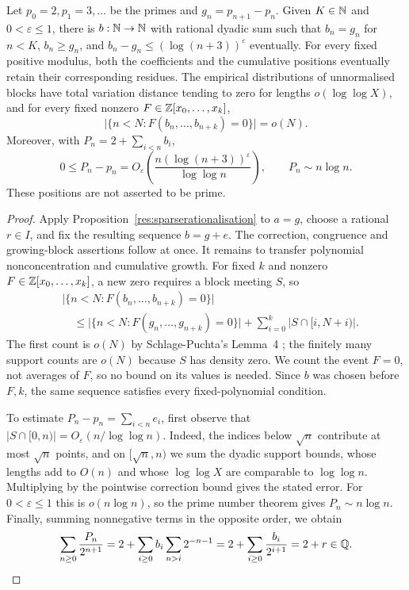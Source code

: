\documentclass[11pt]{article}
\begin{document}
\begin{corollary}\label{res:jointcountermodel}
Let $p_0=2,p_1=3,\ldots$ be the primes and $g_n=p_{n+1}-p_n$.
Given $K\in\mathbb{N}$ and $0<\varepsilon\le1$, there is $b:\mathbb{N}\to\mathbb{N}$ with
rational dyadic sum such that $b_n=g_n$ for $n<K$, $b_n\ge g_n$, and
$b_n-g_n\le(\log(n+3))^\varepsilon$ eventually.  For every fixed positive
modulus, both the coefficients and the cumulative positions eventually
retain their corresponding residues.  The empirical distributions of
unnormalised blocks have total variation distance tending to zero
for lengths $o(\log\log X)$, and for every fixed nonzero
$F\in\mathbb{Z}[x_0,\ldots,x_k]$,
\[
 \bigl|\{n<N:F(b_n,\ldots,b_{n+k})=0\}\bigr|=o(N).
\]
Moreover, with $P_n=2+\sum_{i<n}b_i$,
\[
 0\le P_n-p_n=O_\varepsilon\!\left(
       \frac{n(\log(n+3))^\varepsilon}{\log\log n}\right),
 \qquad P_n\sim n\log n.
\]
These positions are not asserted to be prime.
\end{corollary}

\begin{proof}
Apply Proposition~\ref{res:sparserationalisation} to $a=g$, choose a
rational $r\in I$, and fix the resulting sequence $b=g+e$.  The correction,
congruence and growing-block assertions follow at once.  It remains to
transfer polynomial nonconcentration and cumulative growth.
For fixed $k$ and nonzero $F\in\mathbb{Z}[x_0,\ldots,x_k]$, a new zero requires
a block meeting $S$, so
\[
 \begin{aligned}
 &\bigl|\{n<N:F(b_n,\ldots,b_{n+k})=0\}\bigr|\\
 &\quad\le\bigl|\{n<N:F(g_n,\ldots,g_{n+k})=0\}\bigr|
       +\sum_{i=0}^k|S\cap[i,N+i)|.
 \end{aligned}
\]
The first count is $o(N)$ by Schlage-Puchta's Lemma~4
\cite{schlagepuchta2011}; the finitely many support counts are $o(N)$
because $S$ has density zero.  We count the event $F=0$, not averages
of $F$, so no bound on its values is needed.  Since $b$ was chosen
before $F,k$, the same sequence satisfies every fixed-polynomial condition.

To estimate $P_n-p_n=\sum_{i<n}e_i$, first observe that
$|S\cap[0,n)|=O_\varepsilon(n/\log\log n)$.  Indeed, the indices below
$\sqrt n$ contribute at most $\sqrt n$ points, and on $[\sqrt n,n)$ we
sum the dyadic support bounds, whose lengths add to $O(n)$ and whose
$\log\log X$ are comparable to $\log\log n$.  Multiplying by the
pointwise correction bound gives the stated error.  For
$0<\varepsilon\le1$ this is $o(n\log n)$, so the prime number theorem
\cite[Chapter~6]{mv2007} gives $P_n\sim n\log n$.  Finally, summing
nonnegative terms in the opposite order, we obtain
\[
 \sum_{n\ge0}\frac{P_n}{2^{n+1}}
 =2+\sum_{i\ge0}b_i\sum_{n>i}2^{-n-1}
 =2+\sum_{i\ge0}\frac{b_i}{2^{i+1}}=2+r\in\mathbb{Q}.
\]
\end{proof}
\end{document}
